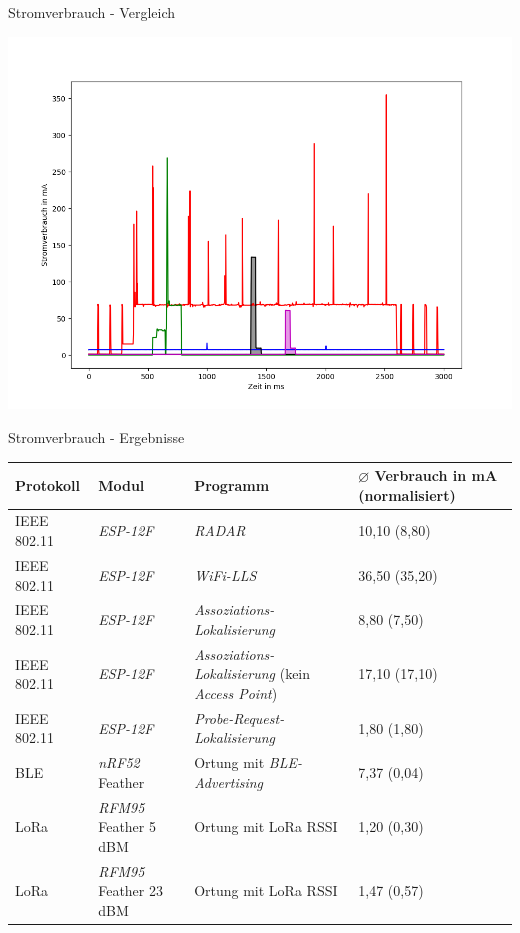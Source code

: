 \documentclass[18pt]{beamer}
\begin{document}
\begin{frame}{Stromverbrauch - Vergleich}
	\begin{minipage}[c][\textheight][t]{\textwidth}
		\centering
		\includegraphics[height=0.85\textheight]{plots/alle4.png}
	\end{minipage}
\end{frame}

\begin{frame}{Stromverbrauch - Ergebnisse}
	\begin{tabular}{l|p{3cm}|p{3.1cm}|R{2.1cm}}
		Protokoll & Modul & Programm  & $\varnothing$ Verbrauch in mA (normalisiert)\\
		\hline
		IEEE 802.11 & \emph{ESP-12F} & \emph{RADAR} & 10,10 (8,80) \\
		\hline
		IEEE 802.11 & \emph{ESP-12F} & \emph{WiFi-LLS} & 36,50 (35,20)\\
		\hline
		IEEE 802.11 & \emph{ESP-12F} & \emph{Assoziations-Lokalisierung} & 8,80 (7,50)\\
		IEEE 802.11 & \emph{ESP-12F} & \emph{Assoziations-Lokalisierung} (kein \emph{Access Point}) & 17,10 (17,10)\\
		\hline
		IEEE 802.11 & \emph{ESP-12F} & \emph{Probe-Request-Lokalisierung} & 1,80 (1,80)\\
		\hline
		BLE & \emph{nRF52} Feather & Ortung mit \emph{BLE-Advertising} & 7,37 (0,04)\\
		\hline
		LoRa & \emph{RFM95} Feather 5 dBM & Ortung mit LoRa RSSI & 1,20 (0,30)\\
		LoRa & \emph{RFM95} Feather 23 dBM & Ortung mit LoRa RSSI & 1,47 (0,57)\\
	\end{tabular}
\end{frame}
\end{document}
